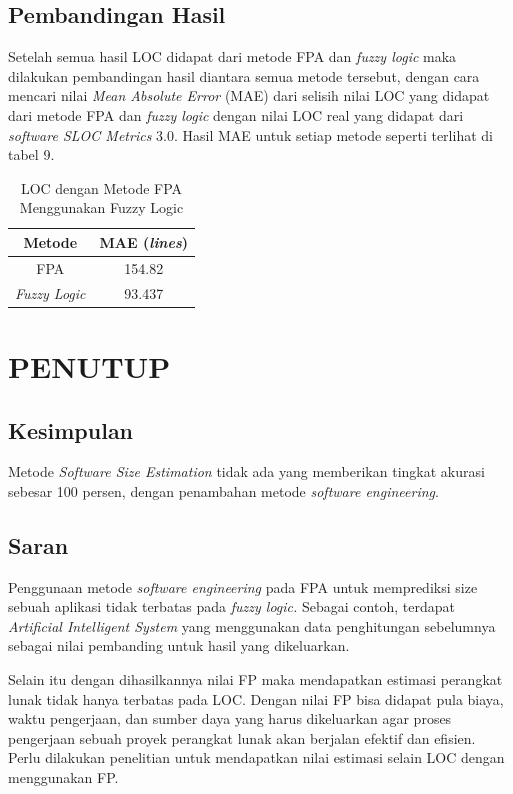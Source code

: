 \documentclass[a4paper]{article}
\begin{document}
\begin{multicols}{2}
\subsection{Pembandingan Hasil}

\par Setelah semua hasil LOC didapat dari metode FPA dan \textit{fuzzy logic} maka dilakukan pembandingan hasil diantara semua metode tersebut, dengan cara mencari nilai \textit{Mean Absolute Error} (MAE) dari selisih nilai LOC yang didapat dari metode FPA dan \textit{fuzzy logic} dengan nilai LOC real yang didapat dari \textit{software SLOC Metrics} 3.0. Hasil MAE untuk setiap metode seperti terlihat di tabel 9.

\begin{table}[H]
    \centering
    \caption{LOC dengan Metode FPA Menggunakan Fuzzy Logic}
    \bigskip
    \begin{tabular}{|c|c|}
        \hline
        \textbf{Metode} & \textbf{MAE (\textit{lines})}\\
        \hline
        FPA & 154.82\\
        \textit{Fuzzy Logic} & 93.437\\
        \hline
    \end{tabular}
    \label{tab9}
\end{table}

\section{PENUTUP}

\subsection{Kesimpulan}

\par Metode \textit{Software Size Estimation} tidak ada yang memberikan tingkat akurasi sebesar 100 persen, dengan penambahan metode \textit{software engineering}.

\subsection{Saran}

\par Penggunaan metode \textit{software engineering} pada FPA untuk memprediksi size sebuah aplikasi tidak terbatas pada \textit{fuzzy logic.} Sebagai contoh, terdapat \textit{Artificial Intelligent System} yang menggunakan data penghitungan sebelumnya sebagai nilai pembanding untuk hasil yang dikeluarkan. 

\par Selain itu dengan dihasilkannya nilai FP maka mendapatkan estimasi perangkat lunak tidak hanya terbatas pada LOC. Dengan nilai FP bisa didapat pula biaya, waktu pengerjaan, dan sumber daya yang harus dikeluarkan agar proses pengerjaan sebuah proyek perangkat lunak akan berjalan efektif dan efisien. Perlu dilakukan penelitian untuk mendapatkan nilai estimasi selain LOC dengan menggunakan FP.




\end{multicols}
\end{document}
